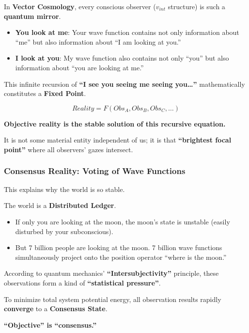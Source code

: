 In \textbf{Vector Cosmology}, every conscious observer ($v_{int}$ structure) is such a \textbf{quantum mirror}.

\begin{itemize}
\item \textbf{You look at me}: Your wave function contains not only information about ``me'' but also information about ``I am looking at you.''

\item \textbf{I look at you}: My wave function also contains not only ``you'' but also information about ``you are looking at me.''
\end{itemize}

This infinite recursion of \textbf{``I see you seeing me seeing you\ldots''} mathematically constitutes a \textbf{Fixed Point}.

\[Reality = F(Obs_A, Obs_B, Obs_C, \dots)\]

\textbf{Objective reality is the stable solution of this recursive equation.}

It is not some material entity independent of us; it is that \textbf{``brightest focal point''} where all observers' gazes intersect.

\subsubsection{Consensus Reality: Voting of Wave Functions}

This explains why the world is so stable.

The world is a \textbf{Distributed Ledger}.

\begin{itemize}
\item If only you are looking at the moon, the moon's state is unstable (easily disturbed by your subconscious).

\item But 7 billion people are looking at the moon. 7 billion wave functions simultaneously project onto the position operator ``where is the moon.''
\end{itemize}

According to quantum mechanics' \textbf{``Intersubjectivity''} principle, these observations form a kind of \textbf{``statistical pressure''}.

To minimize total system potential energy, all observation results rapidly \textbf{converge} to a \textbf{Consensus State}.

\textbf{``Objective'' is ``consensus.''}

